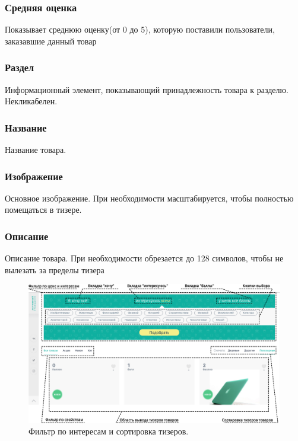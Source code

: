             \subsubsection{Средняя оценка}
                Показывает среднюю оценку(от 0 до 5), которую поставили пользователи, 
                заказавшие данный товар
            \subsubsection{Раздел}
                Информационный элемент, показывающий принадлежность товара к разделю.
                Некликабелен.
            \subsubsection{Название}
                Название товара.
            \subsubsection{Изображение}
                Основное изображение. При необходимости масштабируется, чтобы 
                полностью помещаться в тизере.
            \subsubsection{Описание}
                Описание товара. При необходимости обрезается до 128 символов, 
                чтобы не вылезать за пределы тизера


        \begin{figure}[h]
            \center
            \includegraphics[width=170mm]{02_noauth_funcs/figures/02.eps}
            \caption{Фильтр по интересам и сортировка тизеров.}
            \label{fig:common_items_5}
        \end{figure}

